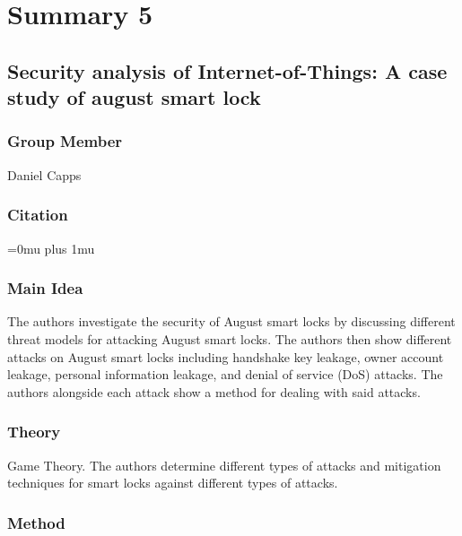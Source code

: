 \section{Summary 5}

\noindent
\subsection{{S}ecurity analysis of {I}nternet-of-{T}hings: {A} case study of august smart lock}

\subsubsection{Group Member}

\noindent
Daniel Capps

\noindent
\subsubsection{Citation}

\Urlmuskip=0mu plus 1mu\relax


\subsubsection{Main Idea}

\noindent
The authors investigate the security of August smart locks by discussing different threat models for attacking August smart locks. The authors then show different attacks on August smart locks including handshake key leakage, owner account leakage, personal information leakage, and denial of service (DoS) attacks. The authors alongside each attack show a method for dealing with said attacks.
 




\subsubsection{Theory}

\noindent
Game Theory. The authors determine different types of attacks and mitigation techniques for smart locks against different types of attacks.



\subsubsection{Method}

